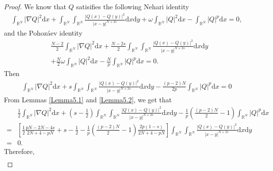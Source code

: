 \documentclass[10pt,a4paper]{amsart}
\begin{document}
\begin{proof}
We know that
$Q$ satisifies the following Nehari identity
\begin{equation*}
\begin{aligned}
\int_{\mathbb{R}^{N}}
|\nabla Q|^{2}
\mathrm{d}x
+
\int_{\mathbb{R}^{N}}
\int_{\mathbb{R}^{N}}
\frac{|Q(x)-Q(y)|^{2}}{|x-y|^{N+2s}}
\mathrm{d}x
\mathrm{d}y
+
\omega
\int_{\mathbb{R}^{N}}
|Q|^{2}
\mathrm{d}x
-
\int_{\mathbb{R}^{N}}
|Q|^{p}
\mathrm{d}x
=0,
\end{aligned}
\end{equation*}
and the Pohoz\'{a}ev identity
\begin{equation*}
\begin{aligned}
&\frac{N-2}{2}
\int_{\mathbb{R}^{N}}
|\nabla Q|^{2}
\mathrm{d}x
+\frac{N-2s}{2}
\int_{\mathbb{R}^{N}}
\int_{\mathbb{R}^{N}}
\frac{|Q(x)-Q(y)|^{2}}{|x-y|^{N+2s}}
\mathrm{d}x
\mathrm{d}y\\
&+
\frac{N}{2}
\omega
\int_{\mathbb{R}^{N}}
|Q|^{2}
\mathrm{d}x
-\frac{N}{p}
\int_{\mathbb{R}^{N}}
|Q|^{p}
\mathrm{d}x
=0.
\end{aligned}
\end{equation*}
Then
\begin{equation*}
\begin{aligned}
\int_{\mathbb{R}^{N}}
|\nabla Q|^{2}
\mathrm{d}x
+s
\int_{\mathbb{R}^{N}}
\int_{\mathbb{R}^{N}}
\frac{|Q(x)-Q(y)|^{2}}{|x-y|^{N+2s}}
\mathrm{d}x
\mathrm{d}y
-\frac{(p-2)N}{2p}
\int_{\mathbb{R}^{N}}
|Q|^{p}
\mathrm{d}x=0
\end{aligned}
\end{equation*}
From Lemmas \ref{Lemma5.1} and \ref{Lemma5.2},
we get that
\begin{equation*}
\begin{aligned}
&\frac{1}{2}
\int_{\mathbb{R}^{N}}
|\nabla Q|^{2}
\mathrm{d}x
+(s-\frac{1}{2})
\int_{\mathbb{R}^{N}}
\int_{\mathbb{R}^{N}}
\frac{|Q(x)-Q(y)|^{2}}{|x-y|^{N+2s}}
\mathrm{d}x
\mathrm{d}y
-\frac{1}{p}
(\frac{(p-2)N}{2}-1)
\int_{\mathbb{R}^{N}}
|Q|^{p}
\mathrm{d}x\\
=&
\left[\frac{1}{2}\frac{pN-2N-4s}{2N+4-pN}
+s-\frac{1}{2}
-\frac{1}{p}
(\frac{(p-2)N}{2}-1)
\frac{2p(1-s)}{2N+4-pN}\right]
\int_{\mathbb{R}^{N}}
\int_{\mathbb{R}^{N}}
\frac{|Q(x)-Q(y)|^{2}}{|x-y|^{N+2s}}
\mathrm{d}x
\mathrm{d}y\\
=&0.
\end{aligned}
\end{equation*}
Therefore,
\begin{equation*}
\begin{aligned}

\end{aligned}
\end{equation*}
\end{proof}
\end{document}
